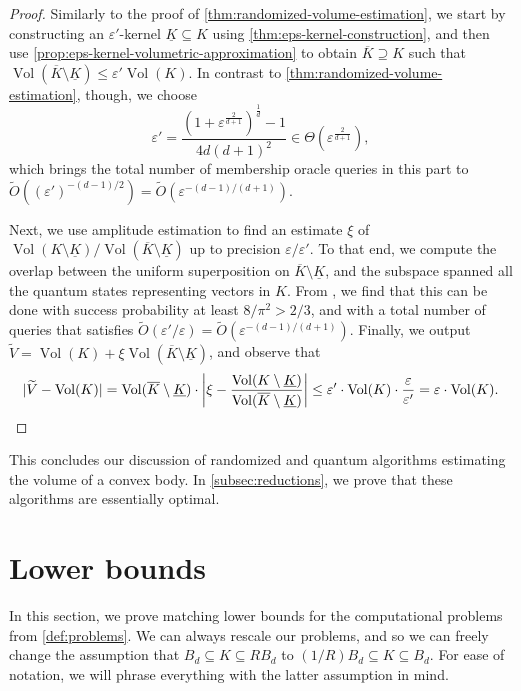 \documentclass[11pt]{article}
\DeclareMathOperator{\Vol}{Vol}
\begin{document}
    \begin{proof}
        Similarly to the proof of \cref{thm:randomized-volume-estimation}, we start by constructing an $\varepsilon'$-kernel $\underline{K} \subseteq K$ using \cref{thm:eps-kernel-construction}, and then use \cref{prop:eps-kernel-volumetric-approximation} to obtain $\overline{K} \supseteq K$ such that $\Vol(\overline{K} \setminus \underline{K}) \leq \varepsilon'\Vol(K)$. In contrast to \cref{thm:randomized-volume-estimation}, though, we choose
        \[\varepsilon' = \frac{(1 + \varepsilon^{\frac{2}{d+1}})^{\frac1d} - 1}{4d(d+1)^2} \in \Theta\left(\varepsilon^{\frac{2}{d+1}}\right),\]
        which brings the total number of membership oracle queries in this part to $\widetilde{O}((\varepsilon')^{-(d-1)/2}) = \widetilde{O}(\varepsilon^{-(d-1)/(d+1)})$.

        Next, we use amplitude estimation to find an estimate $\xi$ of $\Vol(K \setminus \underline{K}) / \Vol(\overline{K} \setminus \underline{K})$ up to precision $\varepsilon/\varepsilon'$. To that end, we compute the overlap between the uniform superposition on $\overline{K} \setminus \underline{K}$, and the subspace spanned all the quantum states representing vectors in $K$. From \cite{BHMT98}, we find that this can be done with success probability at least $8/\pi^2 > 2/3$, and with a total number of queries that satisfies $\widetilde{O}(\varepsilon'/\varepsilon) = \widetilde{O}(\varepsilon^{-(d-1)/(d+1)})$. Finally, we output $\widetilde{V} = \Vol(K) + \xi\Vol(\overline{K} \setminus \underline{K})$, and observe that
        \[|\widetilde{V} - \Vol(K)| = \Vol(\overline{K} \setminus \underline{K}) \cdot \left|\xi - \frac{\Vol(K \setminus \underline{K})}{\Vol(\overline{K} \setminus \underline{K})}\right| \leq \varepsilon' \cdot \Vol(K) \cdot \frac{\varepsilon}{\varepsilon'} = \varepsilon \cdot \Vol(K).\qedhere\]
    \end{proof}

    This concludes our discussion of randomized and quantum algorithms estimating the volume of a convex body. In \cref{subsec:reductions}, we prove that these algorithms are essentially optimal.

    \section{Lower bounds}
    \label{sec:lower-bounds}

    In this section, we prove matching lower bounds for the computational problems from \cref{def:problems}. We can always rescale our problems, and so we can freely change the assumption that $B_d \subseteq K \subseteq RB_d$ to $(1/R)B_d \subseteq K \subseteq B_d$. For ease of notation, we will phrase everything with the latter assumption in mind.
\end{document}

